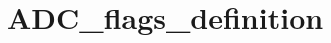 \hypertarget{group___a_d_c__flags__definition}{\section{A\-D\-C\-\_\-flags\-\_\-definition}
\label{group___a_d_c__flags__definition}
}

